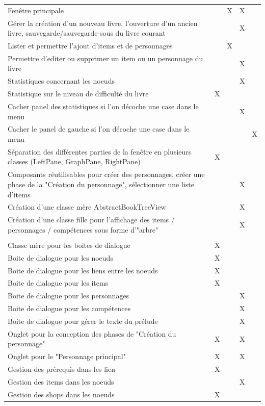 \begin{centering}
\begin{longtable}{|p{8cm}|c|c|c|c|}
				\rowcolor{lightgray} \multicolumn{5}{|c|}{ \textbf{Fenêtre}}\\
				\hline
				Fenêtre principale & & X & X & \\
				\hline
				Gérer la création d'un nouveau livre, l'ouverture d'un ancien livre, sauvegarde/sauvegarde-sous du livre courant & & & X & \\
				\hline
				Lister et permettre l'ajout d'items et de personnages & & X & & \\
				\hline
				Permettre d'editer ou supprimer un item ou un personnage du livre & & & X & \\
				\hline
				Statistiques concernant les noeuds & & & X & \\
				\hline
				Statistique sur le niveau de difficulté du livre & X & & & \\
				\hline
				Cacher panel des statistiques si l'on décoche une case dans le menu & & & X & \\
				\hline
				Cacher le panel de gauche si l'on décoche une case dans le menu & & & & X\\
				\hline
				Séparation des différentes parties de la fenêtre en plusieurs classes (LeftPane, GraphPane, RightPane) & X & & & \\
				\hline
				Composants réutilisables pour créer des personnages, créer une phase de la "Création du personnage", sélectionner une liste d'items & & & X & \\
				\hline
				Création d'une classe mère AbstractBookTreeView & & & X & \\
				\hline
				Création d'une classe fille pour l'affichage des items / personnages / compétences sous forme d'"arbre" & & & X & \\
				\hline

				\rowcolor{lightgray} \multicolumn{5}{|c|}{ \textbf{Boites de dialogue}}\\
				\hline
				Classe mère pour les boites de dialogue & X & & &\\
				\hline
				Boite de dialogue pour les noeuds & X & & & \\
				\hline
				Boite de dialogue pour les liens entre les noeuds & X & & & \\
				\hline
				Boite de dialogue pour les items & X & & & \\
				\hline
				Boite de dialogue pour les personnages & & & X & \\
				\hline
				Boite de dialogue pour les compétences & & & X & \\
				\hline
				Boite de dialogue pour gérer le texte du prélude & & & X & \\
				\hline
				Onglet pour la conception des phases de "Création du personnage" & X & & X & \\
				\hline
				Onglet pour le "Personnage principal" & X & & X & \\
				\hline
				Gestion des prérequis dans les lien & X & & & \\
				\hline
				Gestion des items dans les noeuds & & & X & \\
				\hline
				Gestion des shops dans les noeuds & X & & & \\
				\hline


\end{longtable}
\end{centering}
